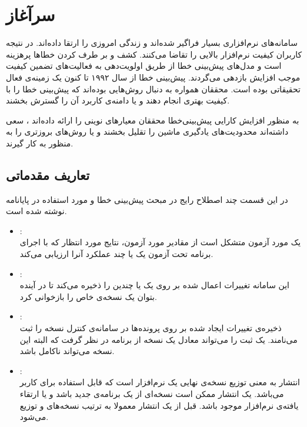 \chapter{سرآغاز}
سامانه‌های نرم‌افزاری بسیار فراگیر شده‌اند و زندگی امروزی را ارتقا داده‌اند. در نتیجه کاربران کیفیت نرم‌افزار بالایی را تقاضا می‌کنند. کشف و بر طرف کردن خطاها پرهزینه است و مدل‌های پیش‌بینی خطا  از طریق اولویت‌دهی به فعالیت‌های تضمین کیفیت موجب افزایش بازدهی می‌گردند. پیش‌بینی خطا از سال ۱۹۹۲ تا کنون یک زمینه‌ی فعال تحقیقاتی بوده است. محققان همواره به دنبال روش‌هایی بوده‌اند که پیش‌بینی خطا را با کیفیت بهتری انجام دهند و یا دامنه‌ی کاربرد آن را گسترش بخشند. 

به  منظور افزایش کارایی پیش‌بینی‌خطا محققان معیارهای نوینی را ارائه داده‌اند \cite{bacchelli2010popular}، سعی داشته‌اند محدودیت‌های یادگیری ماشین را تقلیل بخشند \cite{limsettho2018cross} و یا روش‌های بروزتری را به منظور  به کار گیرند\cite{chen2016software}. 

\section{ تعاریف مقدماتی}
در این قسمت چند اصطلاح رایج در مبحث پیش‌بینی‌ خطا و مورد استفاده در پایانامه نوشته شده است.
\begin{itemize}
	\item 
	: \\
	یک مورد آزمون متشکل است از مقادیر مورد آزمون، نتایج مورد انتظار که با اجرای برنامه تحت آزمون یک یا چند عملکرد آنرا ارزیابی می‌کند. 
	\item
	:\\
	این سامانه تغییرات اعمال شده بر روی یک یا چندین  را ذخیره می‌کند تا در آینده بتوان یک نسخه‌ی خاص را بازخوانی کرد. 
	\item
	:\\
	ذخیره‌ی تغییرات ایجاد شده بر روی پرونده‌ها در سامانه‌ی کنترل نسخه‌ را ثبت می‌نامند. یک ثبت را می‌تواند معادل یک نسخه از برنامه در نظر گرفت که البته این نسخه می‌تواند ناکامل باشد.
	\item
	:\\
	انتشار به معنی توزیع نسخه‌ی نهایی یک نرم‌افزار است که قابل استفاده برای کاربر می‌باشد. یک انتشار ممکن است نسخه‌ای از یک برنامه‌ی جدید باشد و یا ارتقاء یافته‌ی نرم‌افزار موجود باشد. قبل از یک انتشار معمولا به ترتیب نسخه‌های  و  توزیع می‌شود. 
\end{itemize}

